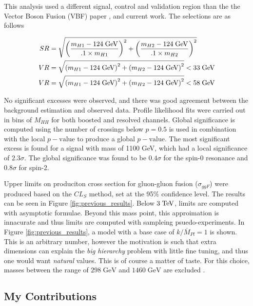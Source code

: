 \documentclass[12pt]{article}
\begin{document}
This analysis used a different signal, control and validation region than the
the Vector Boson Fusion (VBF) paper \cite{atlas_hhbbbb_vbf}, and current work. The
selections are as follows

\begin{align}
    SR &= \sqrt{\left( \frac{m_{H1} - 124\;\text{GeV}}{.1\times m_{H1} } \right)^2 +
    \left( \frac{m_{H2} - 124\;\text{GeV}}{.1\times m_{H2}} \right)^2} \\
    VR &= \sqrt{\left( m_{H1} - 124\;\text{GeV} \right)^2 + \left( m_{H2} -
    124\;\text{GeV} \right)^2} < 33\;\text{GeV} \\
    VR &= \sqrt{\left( m_{H1} - 124\;\text{GeV} \right)^2 + \left( m_{H2} -
    124\;\text{GeV} \right)^2} < 58\;\text{GeV}
\end{align}

No significant excesses were observed, and there was good agreement between the
background estimation and observed data. Profile likelihood fits were carried
out in bins of $M_{HH}$ for both boosted and resolved channels. Global
significance is computed using the number of crossings below $p=0.5$ is used in
combination with the local $p-\text{value}$ to produce a global
$p-\text{value}$. The most significant excess is found for a signal with mass of
1100 GeV, which had a local significance of $2.3\sigma$. The global significance
was found to be $0.4\sigma$ for the spin-0 resonance and $0.8\sigma$ for spin-2.

Upper limits on produciton cross section for gluon-gluon fusion ($\sigma_{ggF}$)
were produced based on the $CL_S$ method, set at the 95\% confidence level. The
results can be seen in Figure \ref{fig:previous_results}. Below $3\;\text{TeV}$,
limits are computed with asymptotic formulae. Beyond this mass point, this
approimation is innacurate and thus limits are computed with sampleing
psuedo-experiments. In Figure \ref{fig:previous_results}, a model with a base
case of $k/\overline{M}_{Pl}=1$ is shown. This is an arbitrary number, however
the motivation is such that extra dimensions can explain the \textit{big
hierarchy} problem with little fine tuning, and thus one would want
\textit{natural} values. This is of course a matter of taste. For this choice,
masses between the range of $298\;\text{GeV}$ and $1460\;\text{GeV}$ are
excluded \cite{atlas_resonant_2022}. 

\subsection{My Contributions}
\end{document}
